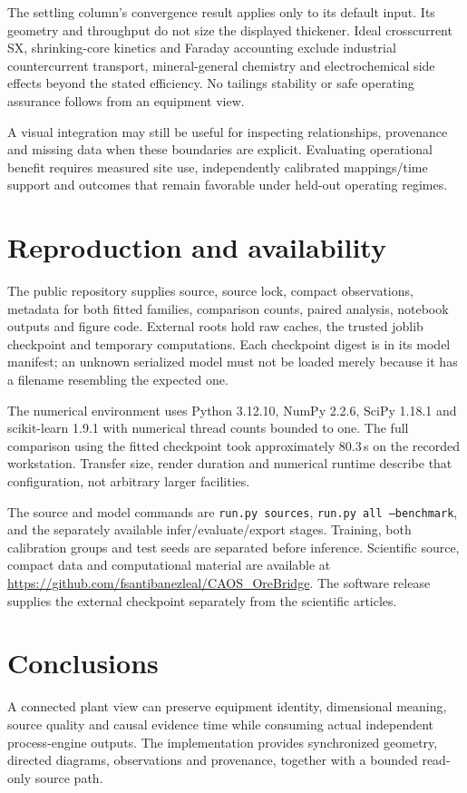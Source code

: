 \documentclass[11pt,a4paper]{article}
\begin{document}
The settling column's convergence result applies only to its default input. Its geometry and throughput do not size the displayed thickener. Ideal crosscurrent SX, shrinking-core kinetics and Faraday accounting exclude industrial countercurrent transport, mineral-general chemistry and electrochemical side effects beyond the stated efficiency. No tailings stability or safe operating assurance follows from an equipment view.

A visual integration may still be useful for inspecting relationships, provenance and missing data when these boundaries are explicit. Evaluating operational benefit requires measured site use, independently calibrated mappings/time support and outcomes that remain favorable under held-out operating regimes.

\section{Reproduction and availability}
The public repository supplies source, source lock, compact observations, metadata for both fitted families, comparison counts, paired analysis, notebook outputs and figure code. External roots hold raw caches, the trusted joblib checkpoint and temporary computations. Each checkpoint digest is in its model manifest; an unknown serialized model must not be loaded merely because it has a filename resembling the expected one.

The numerical environment uses Python 3.12.10, NumPy 2.2.6, SciPy 1.18.1 and scikit-learn 1.9.1 with numerical thread counts bounded to one. The full comparison using the fitted checkpoint took approximately 80.3\,s on the recorded workstation. Transfer size, render duration and numerical runtime describe that configuration, not arbitrary larger facilities.

The source and model commands are \texttt{run.py sources}, \texttt{run.py all --benchmark}, and the separately available infer/evaluate/export stages. Training, both calibration groups and test seeds are separated before inference. Scientific source, compact data and computational material are available at \url{https://github.com/fsantibanezleal/CAOS_OreBridge}. The software release supplies the external checkpoint separately from the scientific articles.

\section{Conclusions}
A connected plant view can preserve equipment identity, dimensional meaning, source quality and causal evidence time while consuming actual independent process-engine outputs. The implementation provides synchronized geometry, directed diagrams, observations and provenance, together with a bounded read-only source path.
\end{document}
